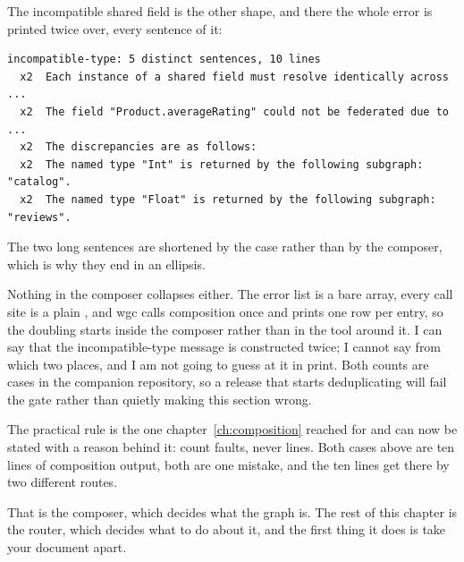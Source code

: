 The incompatible shared field is the other shape, and there the whole error is
printed twice over, every sentence of it:

\begin{verbatim}
incompatible-type: 5 distinct sentences, 10 lines
  x2  Each instance of a shared field must resolve identically across ...
  x2  The field "Product.averageRating" could not be federated due to ...
  x2  The discrepancies are as follows:
  x2  The named type "Int" is returned by the following subgraph: "catalog".
  x2  The named type "Float" is returned by the following subgraph: "reviews".
\end{verbatim}

The two long sentences are shortened by the case rather than by the composer,
which is why they end in an ellipsis.

%
Nothing in the composer collapses either. The error list is a bare array, every
call site is a plain , and wgc calls composition once and prints one
row per entry, so the doubling starts inside the composer rather than in the
tool around it. I can say that the incompatible-type message is constructed
twice; I cannot say from which two places, and I am not going to guess at it in
print. Both counts are cases in the companion repository, so a release that
starts deduplicating will fail the gate rather than quietly making this section
wrong.

The practical rule is the one chapter~\ref{ch:composition} reached for and can
now be stated with a reason behind it: count faults, never lines. Both cases
above are ten lines of composition output, both are one mistake, and the ten
lines get there by two different routes.

\medskip
That is the composer, which decides what the graph is. The rest of this chapter
is the router, which decides what to do about it, and the first thing it does is
take your document apart.

%
